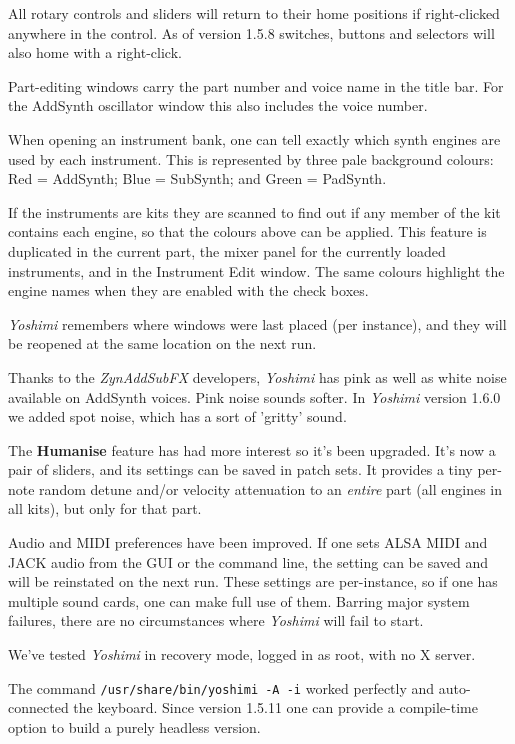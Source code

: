 \documentclass[
 11pt,
 twoside,
 a4paper,
 final                                 %
]{article}
\begin{document}
   All rotary controls and sliders will return
   to their home positions if right-clicked anywhere in the control.
   As of version 1.5.8 switches, buttons and
   selectors will also home with a right-click.

   Part-editing windows carry the part number and voice name in the title
   bar. For the AddSynth oscillator window this also includes the voice
   number.

   When opening an instrument bank, one can tell exactly which synth
   engines are used by each instrument. This is represented by three pale
   background colours: Red = AddSynth; Blue = SubSynth; and Green = PadSynth.

   If the instruments are kits they are scanned to find out if any member of the
   kit contains each engine, so that the colours above can be applied.
   This feature is duplicated in the current part, the mixer panel for the
   currently loaded instruments, and in the Instrument Edit window.
   The same colours highlight the engine names when they are enabled with the
   check boxes.

   \textsl{Yoshimi} remembers where windows were last placed (per instance),
   and they will be reopened at the same location on the next run.

   Thanks to the \textsl{ZynAddSubFX} developers, \textsl{Yoshimi} has pink
   as well as white noise available on AddSynth voices. Pink noise sounds
   softer.  In \textsl{Yoshimi} version 1.6.0 we added spot noise, which has
   a sort of 'gritty' sound.

   The \textbf{Humanise} feature has had more interest so it's been upgraded.
   It's now a pair of sliders, and its settings can be saved in patch sets.
   It provides a tiny per-note random detune and/or velocity attenuation to
   an \textsl{entire} part (all engines in all kits), but only for that part.

   Audio and MIDI preferences have been improved. If one sets ALSA MIDI
   and JACK audio from the GUI or the command line, the setting can be
   saved and will be reinstated on the next run. These settings are
   per-instance, so if one has multiple sound cards, one can make full use of
   them.  Barring major system failures, there are no circumstances where
   \textsl{Yoshimi} will fail to start.

   We've tested \textsl{Yoshimi} in recovery mode, logged in as root, with
   no X server.

   The command \texttt{/usr/share/bin/yoshimi -A -i} worked perfectly and
   auto-connected the keyboard. Since version 1.5.11 one can provide a
   compile-time option to build a purely headless version.
\end{document}
